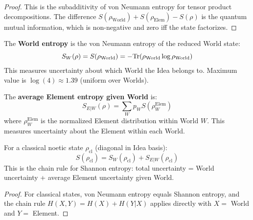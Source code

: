 \begin{proof}
This is the subadditivity of von Neumann entropy for tensor product decompositions. The difference $S(\rho_{\mathrm{World}}) + S(\rho_{\mathrm{Elem}}) - S(\rho)$ is the quantum mutual information, which is non-negative and zero iff the state factorizes.
\end{proof}

\begin{definition}
\label{def:world-entropy}
The \textbf{World entropy} is the von Neumann entropy of the reduced World state:
\[
S_W(\rho) = S(\rho_{\mathrm{World}}) = -\mathrm{Tr}(\rho_{\mathrm{World}} \log \rho_{\mathrm{World}})
\]
This measures uncertainty about which World the Idea belongs to. Maximum value is $\log(4) \approx 1.39$ (uniform over Worlds).
\end{definition}

\begin{definition}
\label{def:conditional-entropy}
The \textbf{average Element entropy given World} is:
\[
S_{E|W}(\rho) = \sum_W p_W S(\rho_W^{\mathrm{Elem}})
\]
where $\rho_W^{\mathrm{Elem}}$ is the normalized Element distribution within World $W$. This measures uncertainty about the Element within each World.
\end{definition}

\begin{theorem}
\label{thm:entropy-decomp}
For a classical noetic state $\rho_{\mathrm{cl}}$ (diagonal in Idea basis):
\[
S(\rho_{\mathrm{cl}}) = S_W(\rho_{\mathrm{cl}}) + S_{E|W}(\rho_{\mathrm{cl}})
\]
This is the chain rule for Shannon entropy: total uncertainty = World uncertainty + average Element uncertainty given World.
\end{theorem}

\begin{proof}
For classical states, von Neumann entropy equals Shannon entropy, and the chain rule $H(X,Y) = H(X) + H(Y|X)$ applies directly with $X = $ World and $Y = $ Element.
\end{proof}

